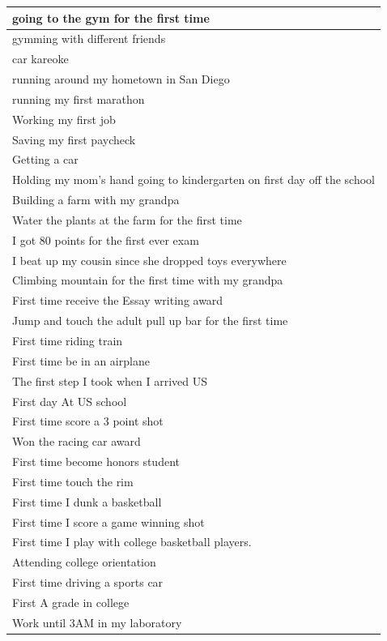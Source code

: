 \documentclass[
  .7em,
  letterpaper,
  DIV=11,
  numbers=noendperiod]{scrartcl}
\begin{document}
\begin{table}
\begin{tabular}{l}
\hline
going to the gym for the first time\\
\hline
gymming with different friends\\
\hline
car kareoke\\
\hline
running around my hometown in San Diego\\
\hline
running my first marathon\\
\hline
Working my first job\\
\hline
Saving my first paycheck\\
\hline
Getting a car\\
\hline
Holding my mom’s hand going to kindergarten on first day off the school\\
\hline
Building a farm with my grandpa\\
\hline
Water the plants at the farm for the first time\\
\hline
I got 80 points for the first ever exam\\
\hline
I beat up my cousin since she dropped toys everywhere\\
\hline
Climbing mountain for the first time with my grandpa\\
\hline
First time receive the Essay writing award\\
\hline
Jump and touch the adult pull up bar for the first time\\
\hline
First time riding train\\
\hline
First time be in an airplane\\
\hline
The first step I took when I arrived US\\
\hline
First day At US school\\
\hline
First time score a 3 point shot\\
\hline
Won the racing car award\\
\hline
First time become honors student\\
\hline
First time touch the rim\\
\hline
First time I dunk a basketball\\
\hline
First time I score a game winning shot\\
\hline
First time I play with college basketball players.\\
\hline
Attending college orientation\\
\hline
First time driving a sports car\\
\hline
First A grade in college\\
\hline
Work until 3AM in my laboratory\\
\hline

\end{tabular}
\end{table}
\end{document}

